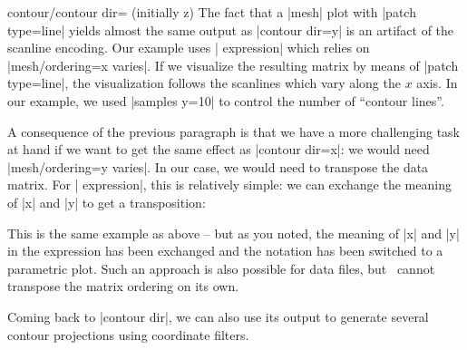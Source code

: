 {{\begin{pgfplotskey}{contour/contour dir= (initially z)}
	The fact that a |mesh| plot with |patch type=line| yields almost the same output as |contour dir=y| is an artifact of the scanline encoding. Our example uses | expression| which relies on |mesh/ordering=x varies|. If we visualize the resulting matrix by means of |patch type=line|, the visualization follows the scanlines which vary along the $x$ axis. In our example, we used |samples y=10| to control the number of ``contour lines''.
	
	A consequence of the previous paragraph is that we have a more challenging task at hand if we want to get the same effect as |contour dir=x|: we would need |mesh/ordering=y varies|. In our case, we would need to transpose the data matrix. For | expression|, this is relatively simple: we can exchange the meaning of |x| and |y| to get a transposition:

\pgfplotsexpensiveexample
\begin{codeexample}[]
\end{codeexample}
	This is the same example as above -- but as you noted, the meaning of |x| and |y| in the expression has been exchanged and the notation has been switched to a parametric plot. Such an approach is also possible for data files, but \PGFPlots\ cannot transpose the matrix ordering on its own.
	

	Coming back to |contour dir|, we can also use its output to generate several contour projections using coordinate filters.
\pgfplotsexpensiveexample
\begin{codeexample}[]
\end{codeexample}
\end{pgfplotskey}}}
